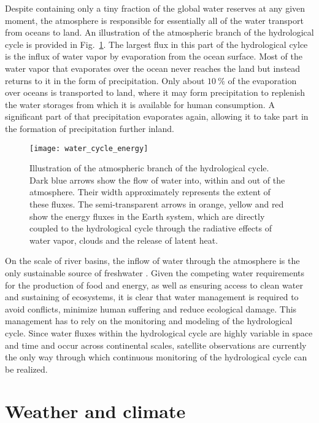 Despite containing only a tiny fraction of the global water reserves at any
given moment, the atmosphere is responsible for essentially all of the water
transport from oceans to land. An illustration of the atmospheric branch of the
hydrological cycle is provided in Fig.~\ref{fig:introduction:water_cycle}. The
largest flux in this part of the hydrological cylce is the influx of water vapor
by evaporation from the ocean surface. Most of the water vapor that evaporates
over the ocean never reaches the land but instead returns to it in the form of
precipitation. Only about $\SI{10}{\percent}$ of the evaporation over oceans is
transported to land, where it may form precipitation to replenish the water
storages from which it is available for human consumption. A significant part of
that precipitation evaporates again, allowing it to take part in the formation
of precipitation further inland.


\begin{figure}
\centering
\texttt{[image: water\_cycle\_energy]}
\caption{
Illustration of the atmospheric branch of the hydrological cycle. Dark blue
arrows show the flow of water into, within and out of the atmosphere. Their
width approximately represents the extent of these fluxes. The
semi-transparent arrows in orange, yellow and red show the energy fluxes in the
Earth system, which are directly coupled to the hydrological cycle through
the radiative effects of water vapor, clouds and the release of latent heat.}
\label{fig:introduction:water_cycle}
\end{figure}

On the scale of river basins, the inflow of water through the atmosphere is the
only sustainable source of freshwater \citep{falkenmark04}. Given the competing
water requirements for the production of food and energy, as well as ensuring
access to clean water and  sustaining of ecosystems, it is clear that water
management is required to avoid conflicts, minimize human suffering and reduce
ecological damage. This management has to rely on the monitoring and modeling of
the hydrological cycle. Since water fluxes within the hydrological cycle are
highly variable in space and time and occur across continental scales, satellite
observations are currently the only way through which continuous monitoring of
the hydrological cycle can be realized.

\section{Weather and climate}


